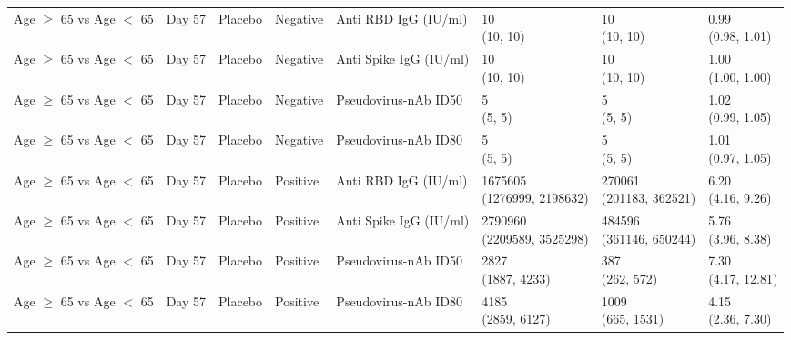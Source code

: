 \documentclass[]{book}
\theoremstyle{definition}
\theoremstyle{definition}
\theoremstyle{definition}
\newcommand{\1}{\mathbbm{1}}
\begin{document}
\begin{landscape}
\begin{ThreePartTable}
\begin{longtable}[t]{>{\raggedright\arraybackslash}p{2.7cm}lllllll}
\addlinespace
Age $\geq$ 65 vs Age $<$ 65 & Day 57 & Placebo & Negative & Anti RBD IgG (IU/ml) & \makecell[l]{10\\(10, 10)} & \makecell[l]{10\\(10, 10)} & \makecell[l]{0.99\\(0.98, 1.01)}\\
Age $\geq$ 65 vs Age $<$ 65 & Day 57 & Placebo & Negative & Anti Spike IgG (IU/ml) & \makecell[l]{10\\(10, 10)} & \makecell[l]{10\\(10, 10)} & \makecell[l]{1.00\\(1.00, 1.00)}\\
Age $\geq$ 65 vs Age $<$ 65 & Day 57 & Placebo & Negative & Pseudovirus-nAb ID50 & \makecell[l]{5\\(5, 5)} & \makecell[l]{5\\(5, 5)} & \makecell[l]{1.02\\(0.99, 1.05)}\\
Age $\geq$ 65 vs Age $<$ 65 & Day 57 & Placebo & Negative & Pseudovirus-nAb ID80 & \makecell[l]{5\\(5, 5)} & \makecell[l]{5\\(5, 5)} & \makecell[l]{1.01\\(0.97, 1.05)}\\
Age $\geq$ 65 vs Age $<$ 65 & Day 57 & Placebo & Positive & Anti RBD IgG (IU/ml) & \makecell[l]{1675605\\(1276999, 2198632)} & \makecell[l]{270061\\(201183, 362521)} & \makecell[l]{6.20\\(4.16, 9.26)}\\
\addlinespace
Age $\geq$ 65 vs Age $<$ 65 & Day 57 & Placebo & Positive & Anti Spike IgG (IU/ml) & \makecell[l]{2790960\\(2209589, 3525298)} & \makecell[l]{484596\\(361146, 650244)} & \makecell[l]{5.76\\(3.96, 8.38)}\\
Age $\geq$ 65 vs Age $<$ 65 & Day 57 & Placebo & Positive & Pseudovirus-nAb ID50 & \makecell[l]{2827\\(1887, 4233)} & \makecell[l]{387\\(262, 572)} & \makecell[l]{7.30\\(4.17, 12.81)}\\
Age $\geq$ 65 vs Age $<$ 65 & Day 57 & Placebo & Positive & Pseudovirus-nAb ID80 & \makecell[l]{4185\\(2859, 6127)} & \makecell[l]{1009\\(665, 1531)} & \makecell[l]{4.15\\(2.36, 7.30)}\\

\end{longtable}
\end{ThreePartTable}
\end{landscape}
\end{document}
